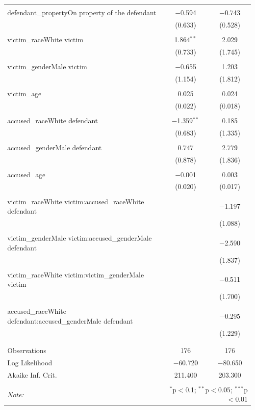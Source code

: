 \documentclass[12pt,article]{article}
\begin{document}
\begin{table}[!htbp]
\begin{tabular}{@{\extracolsep{5pt}}lcc}
  & & \\ 
 defendant\_propertyOn property of the defendant & $-$0.594 & $-$0.743 \\ 
  & (0.633) & (0.528) \\ 
  & & \\ 
 victim\_raceWhite victim & 1.864$^{**}$ & 2.029 \\ 
  & (0.733) & (1.745) \\ 
  & & \\ 
 victim\_genderMale victim & $-$0.655 & 1.203 \\ 
  & (1.154) & (1.812) \\ 
  & & \\ 
 victim\_age & 0.025 & 0.024 \\ 
  & (0.022) & (0.018) \\ 
  & & \\ 
 accused\_raceWhite defendant & $-$1.359$^{**}$ & 0.185 \\ 
  & (0.683) & (1.335) \\ 
  & & \\ 
 accused\_genderMale defendant & 0.747 & 2.779 \\ 
  & (0.878) & (1.836) \\ 
  & & \\ 
 accused\_age & $-$0.001 & 0.003 \\ 
  & (0.020) & (0.017) \\ 
  & & \\ 
 victim\_raceWhite victim:accused\_raceWhite defendant &  & $-$1.197 \\ 
  &  & (1.088) \\ 
  & & \\ 
 victim\_genderMale victim:accused\_genderMale defendant &  & $-$2.590 \\ 
  &  & (1.837) \\ 
  & & \\ 
 victim\_raceWhite victim:victim\_genderMale victim &  & $-$0.511 \\ 
  &  & (1.700) \\ 
  & & \\ 
 accused\_raceWhite defendant:accused\_genderMale defendant &  & $-$0.295 \\ 
  &  & (1.229) \\ 
  & & \\ 
\hline \\[-1.8ex] 
Observations & 176 & 176 \\ 
Log Likelihood & $-$60.720 & $-$80.650 \\ 
Akaike Inf. Crit. & 211.400 & 203.300 \\ 
\hline 
\hline \\[-1.8ex] 
\textit{Note:}  & \multicolumn{2}{r}{$^{*}$p$<$0.1; $^{**}$p$<$0.05; $^{***}$p$<$0.01} \\ 
\end{tabular} 
\end{table}
\end{document}
